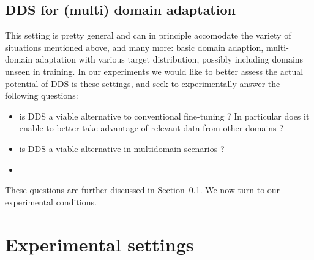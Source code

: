 \documentclass[11pt,a4paper]{article}
\newcommand{\fyTodo}[1]{\Todo[FY:]{\textcolor{orange}{#1}}}
\newcommand{\system}[1]{\texttt{{#1}}}
\begin{document}
\fyTodo{Explain lr, may be more}\fyTodo{More refs to the algorithm }
\subsection{DDS for (multi) domain adaptation}

This setting is pretty general and can in principle accomodate the variety of situations mentioned  above, and many more: basic domain adaption, multi-domain adaptation with various target distribution, possibly including domains unseen in training. In our experiments we would like to better assess the actual potential of DDS is these settings, and seek to experimentally answer the following questions:
\begin{itemize}
\item is DDS a viable alternative to conventional fine-tuning ? In particular does it enable to better take advantage of relevant data from other domains ?
\item is DDS a viable alternative in multidomain scenarios ?
\item \fyTodo{TBContinued}
\end{itemize}

These questions are further discussed in Section~\ref{}. We now turn to our experimental conditions.
\section{Experimental settings} \label{sec:exp}
\end{document}
